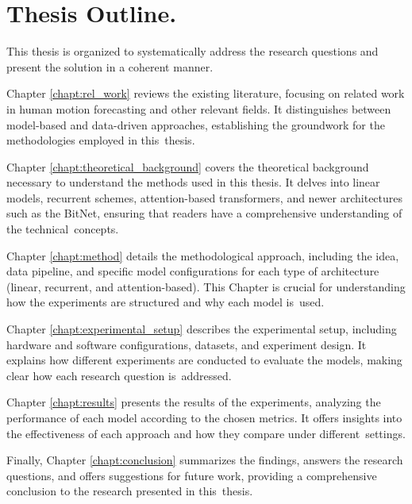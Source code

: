 \section{Thesis Outline.}
\label{sec:outline}
This thesis is organized to systematically address the research questions and present the solution in a coherent manner. 

Chapter \ref{chapt:rel_work} reviews the existing literature, focusing on related work in human motion forecasting and other relevant fields. It distinguishes between model-based and data-driven approaches, establishing the groundwork for the methodologies employed in this~thesis.

Chapter \ref{chapt:theoretical_background} covers the theoretical background necessary to understand the methods used in this thesis. It delves into linear models, recurrent schemes, attention-based transformers, and newer architectures such as the BitNet, ensuring that readers have a comprehensive understanding of the technical~concepts.

Chapter \ref{chapt:method} details the methodological approach, including the idea, data pipeline, and specific model configurations for each type of architecture (linear, recurrent, and attention-based). This Chapter is crucial for understanding how the experiments are structured and why each model is~used.

Chapter \ref{chapt:experimental_setup} describes the experimental setup, including hardware and software configurations, datasets, and experiment design. It explains how different experiments are conducted to evaluate the models, making clear how each research question is~addressed.

Chapter \ref{chapt:results} presents the results of the experiments, analyzing the performance of each model according to the chosen metrics. It offers insights into the effectiveness of each approach and how they compare under different~settings.

Finally, Chapter \ref{chapt:conclusion} summarizes the findings, answers the research questions, and offers suggestions for future work, providing a comprehensive conclusion to the research presented in this~thesis.
